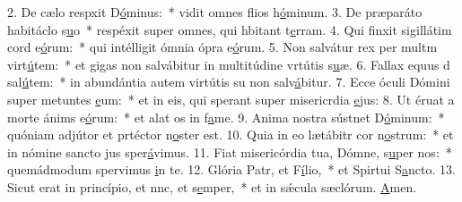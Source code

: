 2. De cælo respxit D\uline{ó}minus:~* vidit omnes flios h\uline{ó}minum.
3. De præparáto habitáclo s\uline{u}o~* respéxit super omnes, qui hbitant t\uline{e}rram.
4. Qui finxit sigillátim cord e\uline{ó}rum:~* qui intélligit ómnia ópra e\uline{ó}rum.
5. Non salvátur rex per multm virt\uline{ú}tem:~* et gigas non salvábitur in multitúdine vrtútis s\uline{u}æ.
6. Fallax equus d sal\uline{ú}tem:~* in abundántia autem virtútis su non salv\uline{á}bitur.
7. Ecce óculi Dómini super metuntes \uline{e}um:~* et in eis, qui sperant super misericrdia \uline{e}jus:
8. Ut éruat a morte ánims e\uline{ó}rum:~* et alat os in f\uline{a}me.
9. Anima nostra sústnet D\uline{ó}minum:~* quóniam adjútor et prtéctor n\uline{o}ster est.
10. Quia in eo lætábitr cor n\uline{o}strum:~* et in nómine sancto jus sper\uline{á}vimus.
11. Fiat misericórdia tua, Dómne, s\uline{u}per nos:~* quemádmodum spervimus \uline{i}n te.
12. Glória Patr, et F\uline{í}lio,~* et Spirtui S\uline{a}ncto.
13. Sicut erat in princípio, et nnc, et s\uline{e}mper,~* et in sǽcula sæclórum. \uline{A}men.
